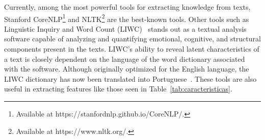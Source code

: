\documentclass{ieeeaccess}
\begin{document}

Currently, among the most powerful tools for extracting knowledge from texts, Stanford CoreNLP\footnote{Available at https://stanfordnlp.github.io/CoreNLP/.} and NLTK\footnote{Available at https://www.nltk.org/.} are the best-known tools. Other tools such as Linguistic Inquiry and Word Count (LIWC)~\cite{pennebaker2001linguistic} stands out as a textual analysis software capable of analyzing and quantifying emotional, cognitive, and structural components present in the texts. LIWC's ability to reveal latent characteristics of a text is closely dependent on the language of the word dictionary associated with the software. Although originally optimized for the English language, the LIWC dictionary has now been translated into Portuguese~\cite{balage2013evaluation}. These tools are also useful in extracting features like those seen in Table~\ref{tab:caracteristicas}.

\end{document}
